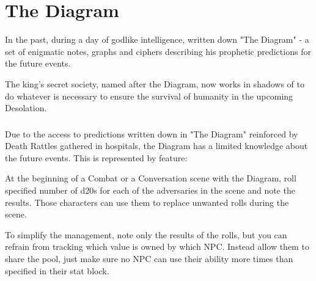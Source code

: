 \section{The Diagram}
\label{enemyFractionDiagram}

In the past, during a day of godlike intelligence, \npcTaravangian{} written down "The Diagram" - a set of enigmatic notes, graphs and ciphers describing his prophetic predictions for the future events. 

The king's secret society, named after the Diagram, now works in shadows of \locationKharbranth{} to do whatever is necessary to ensure the survival of humanity in the upcoming Desolation.



\subsubsection{\abilityFutureKnowledgeName{}}

Due to the access to predictions written down in "The Diagram" reinforced by Death Rattles gathered in \locationKharbranth{} hospitals, the Diagram has a limited knowledge about the future events. This is represented by \abilityFutureKnowledgeName{} feature:

\abilityFutureKnowledge{}

At the beginning of a Combat or a Conversation scene with the Diagram, roll specified number of d20s for each of the adversaries in the scene and note the results. Those characters can use them to replace unwanted rolls during the scene.

To simplify the management, note only the results of the rolls, but you can refrain from tracking which value is owned by which NPC. Instead allow them to share the pool, just make sure no NPC can use their ability more times than specified in their stat block.



\newpage

\newpage

